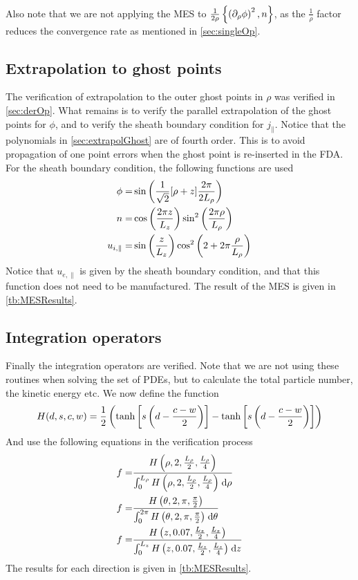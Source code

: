 Also note that we are not applying the MES to $\frac{1}{2\rho}\left\{\left(\partial_{\rho} \phi\right)^2,n\right\}$, as the $\frac{1}{\rho}$ factor reduces the convergence rate as mentioned in \cref{sec:singleOp}.

\subsection{Extrapolation to ghost points}
%
The verification of extrapolation to the outer ghost points in $\rho$ was verified in \cref{sec:derOp}.
What remains is to verify the parallel extrapolation of the ghost points for $\phi$, and to verify the sheath boundary condition for $j_{\|}$.
Notice that the polynomials in \cref{sec:extrapolGhost} are of fourth order.
This is to avoid propagation of one point errors when the ghost point is re-inserted in the FDA.
For the sheath boundary condition, the following functions are used
%
\begin{align}
    \phi =& \sin\left(\frac{1}{\sqrt{2}}[\rho + z]\frac{2\pi}{2L_\rho}\right)
    \label{eq:MESPhiSheath}
    \\
    n =& \cos\left(\frac{2\pi z}{L_z}\right)\sin^2\left(\frac{2\pi\rho}{L_\rho}\right)
    \label{eq:MESNSheath}
    \\
    u_{i, \|} =& \sin\left(\frac{z}{L_z}\right)\cos^2\left(2+2\pi\frac{\rho}{L_\rho}\right)
    \label{eq:MEUISheath}
\end{align}
%
Notice that $u_{e,\|}$ is given by the sheath boundary condition, and that this function does not need to be manufactured.
The result of the MES is given in \cref{tb:MESResults}.

\subsection{Integration operators}
%
Finally the integration operators are verified.
Note that we are not using these routines when solving the set of PDEs, but to calculate the total particle number, the kinetic energy etc.
We now define the function
%
\begin{align*}
    H(d,s,c,w) = \frac{1}{2}\left(\tanh\left[s\left(d-\frac{c-w}{2}\right)\right]-\tanh\left[s\left(d-\frac{c-w}{2}\right)\right]\right)
\end{align*}
%
And use the following equations in the verification process
%
\begin{align}
f =& \frac{H\left(\rho, 2,\frac{L_\rho}{2}, \frac{L_\rho}{4}\right)}{\int_{0}^{L_\rho} {H\left(\rho, 2,\frac{L_\rho}{2}, \frac{L_\rho}{4}\right)} \; \text{d} {\rho}}
\label{eq:MESRhoInt}
\\
f =& \frac{H\left(\theta, 2,\pi, \frac{\pi}{2}\right)}{\int_{0}^{2\pi} {H\left(\theta, 2,\pi, \frac{\pi}{2}\right)} \; \text{d} {\theta}}
\label{eq:MESThetaInt}
\\
f =& \frac{H\left(z, 0.07,\frac{L_z}{2}, \frac{L_z}{4}\right)}{\int_{0}^{L_z} {H\left(z, 0.07,\frac{L_z}{2}, \frac{L_z}{4}\right)} \; \text{d} {z}}
\label{eq:MESZInt}
\end{align}
%
The results for each direction is given in \cref{tb:MESResults}.

